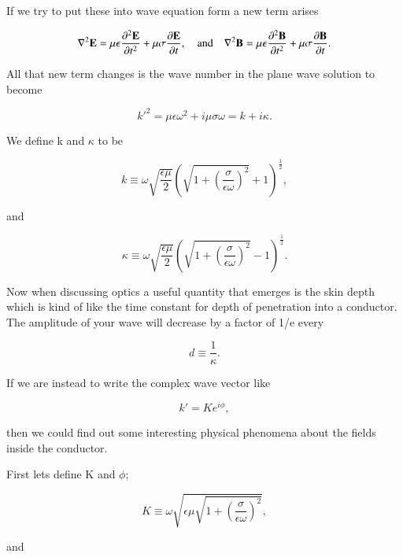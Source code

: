 \documentclass[preprint, review,12pt]{elsarticle}
\def\b{\textbf}
\def\={\equiv}
\def\lap{\nabla^2}
\def\and{\quad \text{and} \quad}
\def\9{\left(}
\def\0{\right)}
\newcommand{\pd}[2]{\frac{\partial #1 }{\partial #2}}
\newcommand{\pds}[2]{\frac{\partial^2 #1 }{\partial {#2}^2}}
\begin{document}
If we try to put these into wave equation form a new term arises

\begin{equation}
    \lap \b E = \mu \epsilon \pds{\b E}{t} + \mu \sigma \pd{\b E}{t}, \and \lap \b B = \mu \epsilon \pds{\b B}{t} + \mu \sigma \pd{\b B}{t}.
\end{equation}

All that new term changes is the wave number in the plane wave solution to become 

\begin{equation}
    {k'}^2 = \mu \epsilon\omega^2 + i \mu \sigma \omega = k + i\kappa.
\end{equation}

We define k and $\kappa$ to be

\begin{equation}
     k \= \omega\sqrt{\frac{\epsilon\mu}{2}} \9 \sqrt{1 + \9 \frac{\sigma}{\epsilon\omega} \0^2} + 1 \0^{\frac{1}{2}},
\end{equation}

and

\begin{equation}
    \kappa \= \omega\sqrt{\frac{\epsilon\mu}{2}} \9 \sqrt{1 + \9 \frac{\sigma}{\epsilon\omega} \0^2} - 1 \0^{\frac{1}{2}}.
\end{equation}

Now when discussing optics a useful quantity that emerges is the skin depth which is kind of like the time constant for depth of penetration into a conductor. The amplitude of your wave will decrease by a factor of 1/e every

\begin{equation}
    d \= \frac{1}{\kappa}.
\end{equation}

If we are instead to write the complex wave vector like

\begin{equation}
    k' = Ke^{i \phi},
\end{equation}

then we could find out some interesting physical phenomena about the fields inside the conductor. 

First lets define K and $\phi$;

\begin{equation}
    K \= \omega \sqrt{\epsilon \mu \sqrt{1 + \9 \frac{\sigma}{\epsilon\omega} \0^2}},
\end{equation}

and 
\end{document}
